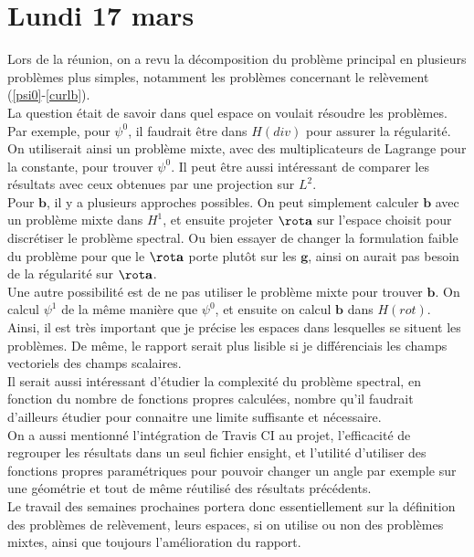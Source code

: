 \section{Lundi 17 mars}

Lors de la réunion, on a revu la décomposition du problème principal en plusieurs problèmes plus simples, notamment les problèmes concernant le relèvement (\ref{psi0}-\ref{curlb}).\\
La question était de savoir dans quel espace on voulait résoudre les problèmes. Par exemple, pour $\psi^0$, il faudrait être dans $H(div)$ pour assurer la régularité. On utiliserait ainsi un problème mixte, avec des multiplicateurs de Lagrange pour la constante, pour trouver $\psi^0$. Il peut être aussi intéressant de comparer les résultats avec ceux obtenues par une projection sur $L^2$.\\

Pour $\mathbf{b}$, il y a plusieurs approches possibles. On peut simplement calculer $\mathbf{b}$ avec un problème mixte dans $H^1$, et ensuite projeter $\rot\mathbf{a}$ sur l’espace choisit pour discrétiser le problème spectral. Ou bien essayer de changer la formulation faible du problème pour que le $\rot\mathbf{a}$ porte plutôt sur les $\mathbf{g}$, ainsi on aurait pas besoin de la  régularité sur $\rot\mathbf{a}$.\\
Une autre possibilité est de ne pas utiliser le problème mixte pour trouver $\mathbf{b}$. On calcul $\psi^1$ de la même manière que $\psi^0$, et ensuite on calcul $\mathbf{b}$ dans $H(rot)$.\\

Ainsi, il est très important que je précise les espaces dans lesquelles se situent les problèmes. De même, le rapport serait plus lisible si je différenciais les champs vectoriels des champs scalaires.\\
Il serait aussi intéressant d’étudier la complexité du problème spectral, en fonction du nombre de fonctions propres calculées, nombre qu’il  faudrait d’ailleurs étudier pour connaitre une limite suffisante et nécessaire.\\

On a aussi mentionné l’intégration de Travis CI au projet, l’efficacité de regrouper les résultats dans un seul fichier ensight, et l’utilité d’utiliser des fonctions propres paramétriques pour pouvoir changer un angle par exemple sur une géométrie et tout de même réutilisé des résultats précédents.\\

Le travail des semaines prochaines portera donc essentiellement sur la définition des problèmes de relèvement, leurs espaces, si on utilise ou non des problèmes mixtes, ainsi que toujours l’amélioration du rapport.


